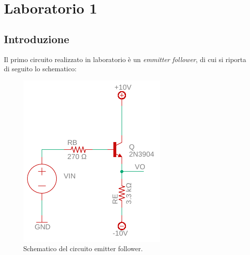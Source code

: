 \chapter{Laboratorio 1}
\section{Introduzione}
Il primo circuito realizzato in laboratorio è un \textit{emmitter follower}, di cui si riporta di seguito lo schematico:
\begin{figure}[h!]
	\centering
	\includegraphics[width=0.4\linewidth]{./OtherFiles/Laboratorio 1/emitter follower}
	\caption{Schematico del circuito emitter follower.}
	\label{fig:emitterfollwer}
\end{figure}
